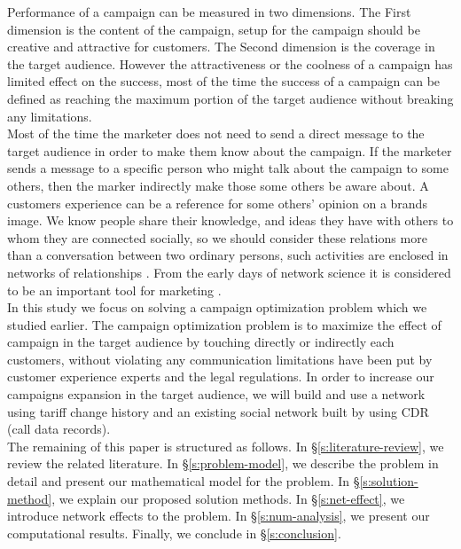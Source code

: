 \documentclass[11pt]{article}
\begin{document}
Performance of a campaign can be measured in two dimensions. The First dimension is the content of the campaign, setup for the campaign should be creative and attractive for customers. The Second dimension is the coverage in the target audience. However the attractiveness or the coolness of a campaign has limited effect on the success\citep{altshuler}, most of the time the success of a campaign can be defined as reaching the maximum portion of the target audience without breaking any limitations. \\

Most of the time the marketer does not need to send a direct message to the target audience in order to make them know about the campaign. If the marketer sends a message to a specific person who might talk about the campaign to some others, then the marker indirectly make those some others be aware about. A customers experience can be a reference for some others' opinion on a brands image. We know people share their knowledge, and ideas they have with others to whom they are connected socially, so we should consider these relations more than a conversation between two ordinary persons, such activities are enclosed in networks of relationships \citep{webster}. From the early days of network science it is considered to be an important tool for marketing \citep{arabie, webster}. \\

In this study we focus on solving a campaign optimization problem which we studied earlier. The campaign optimization problem is to maximize the effect of campaign in the target audience by touching directly or indirectly each customers, without violating any communication limitations have been put by customer experience experts and the legal regulations. In order to increase our campaigns expansion in the target audience, we will build and use a network using tariff change history and an existing social network built by using CDR (call data records).\\

The remaining of this paper is structured as follows. In \S \ref{s:literature-review}, we review the related literature. In \S \ref{s:problem-model}, we describe the problem in detail and present our mathematical model for the problem. In \S \ref{s:solution-method}, we explain our proposed solution methods. In \S \ref{s:net-effect}, we introduce network effects to the problem. In \S \ref{s:num-analysis}, we present our computational results. Finally, we conclude in \S \ref{s:conclusion}.
\end{document}
